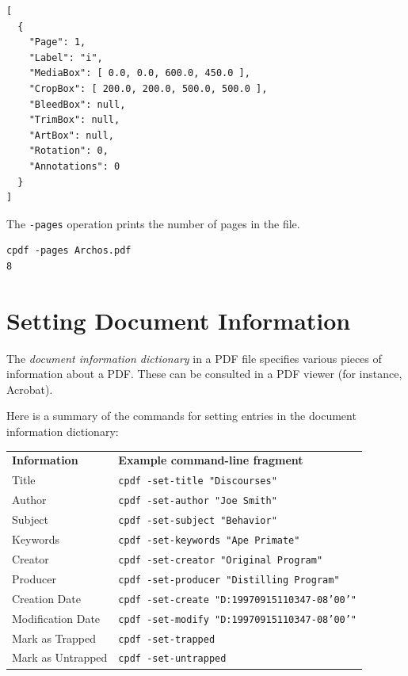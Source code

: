 \documentclass{book}
\newcommand{\smallgap}{\bigskip}
\begin{document}
\begin{framed}
{\small\begin{verbatim}
[
  {
    "Page": 1,
    "Label": "i",
    "MediaBox": [ 0.0, 0.0, 600.0, 450.0 ],
    "CropBox": [ 200.0, 200.0, 500.0, 500.0 ],
    "BleedBox": null,
    "TrimBox": null,
    "ArtBox": null,
    "Rotation": 0,
    "Annotations": 0
  }
]
\end{verbatim}}
\end{framed}

\smallgap 
\noindent The \texttt{-pages} operation prints the number of pages in the file.

\begin{framed}
{\small\begin{verbatim}
cpdf -pages Archos.pdf
8
\end{verbatim}}
\end{framed}

\section{Setting Document Information}
\label{setdocinfo}
  The \textit{document information dictionary} in a PDF file specifies various
pieces of information about a PDF. These can be consulted in a PDF viewer (for
instance, Acrobat).

  Here is a summary of the commands for setting entries in the document
information dictionary:

{\small\begin{framed}
    \noindent\begin{tabular}{ll}
       \textbf{Information} & \textbf{Example command-line fragment} \\
       Title & \texttt{cpdf -set-title "Discourses"} \\
       Author & \texttt{cpdf -set-author "Joe Smith"} \\
       Subject & \texttt{cpdf -set-subject "Behavior"} \\
       Keywords & \texttt{cpdf -set-keywords "Ape Primate"} \\
       Creator & \texttt{cpdf -set-creator "Original Program"} \\
       Producer & \texttt{cpdf -set-producer "Distilling Program"} \\
       Creation Date & \texttt{cpdf -set-create "D:19970915110347-08'00'"} \\
       Modification Date & \texttt{cpdf -set-modify "D:19970915110347-08'00'"} \\
       Mark as Trapped & \texttt{cpdf -set-trapped} \\
       Mark as Untrapped & \texttt{cpdf -set-untrapped} \\
    \end{tabular}
\end{framed}}
\end{document}

